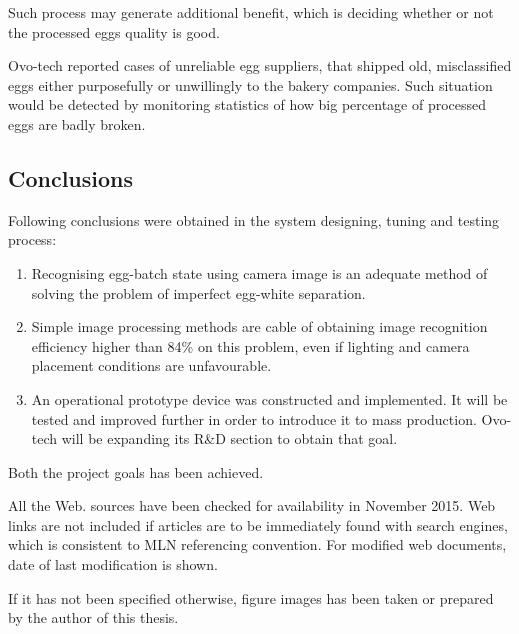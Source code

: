\documentclass[12pt,twoside,a4paper]{article}
\begin{document}
Such process may generate additional benefit, which is deciding whether or not the processed eggs quality is good.

Ovo-tech reported cases of unreliable egg suppliers, that shipped old, misclassified eggs either purposefully or unwillingly to the bakery companies.
Such situation would be detected by monitoring statistics of how big percentage of processed eggs are badly broken.

\subsection{Conclusions}

Following conclusions were obtained in the system designing, tuning and testing process:
\begin{enumerate}
\item Recognising egg-batch state using camera image is an adequate method of solving the problem of imperfect egg-white separation.
\item Simple image processing methods are cable of obtaining image recognition efficiency higher than 84\% on this problem, even if lighting and camera placement conditions are unfavourable.
\item An operational prototype device was constructed and implemented. It will be tested and improved further in order to introduce it to mass production. Ovo-tech will be expanding its R\&D section to obtain that goal.
\end{enumerate}

Both the project goals has been achieved.


All the Web. sources have been checked for availability in November 2015.
Web links are not included if articles are to be immediately found with search engines, which is consistent to MLN referencing convention.
For modified web documents, date of last modification is shown.

If it has not been specified otherwise, figure images has been taken or prepared by the author of this thesis.
\end{document}
